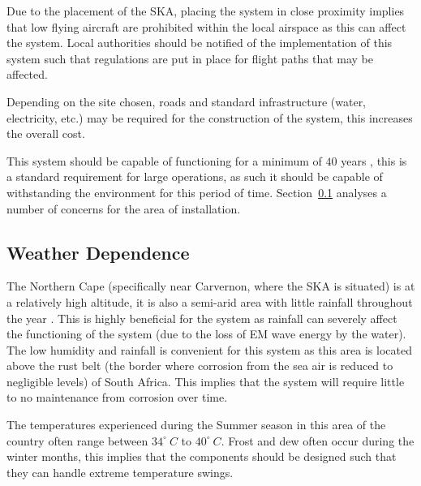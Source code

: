 \documentclass[11pt]{witseiepaper}
\begin{document}
\begin{bibunit}[witseie]
Due to the placement of the SKA, placing the system in close proximity implies that low flying aircraft are prohibited within the local airspace as this can affect the system.
Local authorities should be notified of the implementation of this system such that regulations are put in place for flight paths that may be affected.

Depending on the site chosen, roads and standard infrastructure (water, electricity, etc.) may be required for the construction of the system, this increases the overall cost.

This system should be capable of functioning for a minimum of $40$ years \cite[p.~336]{AMISRCosting}, this is a standard requirement for large operations, as such it should be capable of withstanding the environment for this period of time. Section~\ref{sec:WeatherDependence} analyses a number of concerns for the area of installation.

\subsection{Weather Dependence} \label{sec:WeatherDependence}
The Northern Cape (specifically near Carvernon, where the SKA is situated) is at a relatively high altitude, it is also a semi-arid area with little rainfall throughout the year \cite{Rainfall}.
This is highly beneficial for the system as rainfall can severely affect the functioning of the system (due to the loss of EM wave energy by the water).
The low humidity and rainfall is convenient for this system as this area is located above the rust belt (the border where corrosion from the sea air is reduced to negligible levels) of South Africa. This implies that the system will require little to no maintenance from corrosion over time.

The temperatures experienced during the Summer season in this area of the country often range between $34^{\circ}~C$ to $40^{\circ}~C$. Frost and dew often occur during the winter months, this implies that the components should be designed such that they can handle extreme temperature swings.




\end{bibunit}
\end{document}
